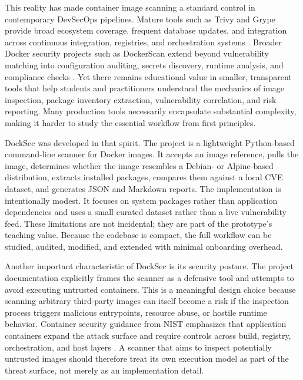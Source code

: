 \documentclass[12pt,draftclsnofoot,onecolumn]{IEEEtran}
\begin{document}
This reality has made container image scanning a standard control in contemporary DevSecOps pipelines. Mature tools such as Trivy and Grype provide broad ecosystem coverage, frequent database updates, and integration across continuous integration, registries, and orchestration systems \cite{trivyimage,grype}. Broader Docker security projects such as DockerScan extend beyond vulnerability matching into configuration auditing, secrets discovery, runtime analysis, and compliance checks \cite{dockerscanrepo}. Yet there remains educational value in smaller, transparent tools that help students and practitioners understand the mechanics of image inspection, package inventory extraction, vulnerability correlation, and risk reporting. Many production tools necessarily encapsulate substantial complexity, making it harder to study the essential workflow from first principles.

DockSec was developed in that spirit. The project is a lightweight Python-based command-line scanner for Docker images. It accepts an image reference, pulls the image, determines whether the image resembles a Debian- or Alpine-based distribution, extracts installed packages, compares them against a local CVE dataset, and generates JSON and Markdown reports. The implementation is intentionally modest. It focuses on system packages rather than application dependencies and uses a small curated dataset rather than a live vulnerability feed. These limitations are not incidental; they are part of the prototype's teaching value. Because the codebase is compact, the full workflow can be studied, audited, modified, and extended with minimal onboarding overhead.

Another important characteristic of DockSec is its security posture. The project documentation explicitly frames the scanner as a defensive tool and attempts to avoid executing untrusted containers. This is a meaningful design choice because scanning arbitrary third-party images can itself become a risk if the inspection process triggers malicious entrypoints, resource abuse, or hostile runtime behavior. Container security guidance from NIST emphasizes that application containers expand the attack surface and require controls across build, registry, orchestration, and host layers \cite{nist800190}. A scanner that aims to inspect potentially untrusted images should therefore treat its own execution model as part of the threat surface, not merely as an implementation detail.
\end{document}
